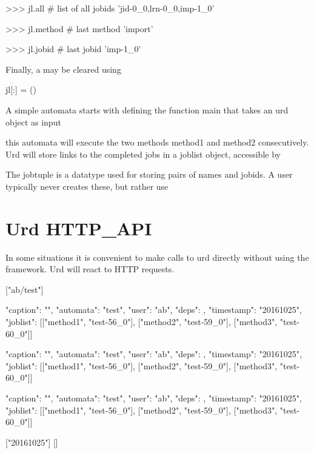 \begin{python}
>>> jl.all              # list of all jobids
'jid-0_0,lrn-0_0,imp-1_0'

>>> jl.method           # last method
'import'

>>> jl.jobid            # last jobid
'imp-1_0'
\end{python}

Finally, a \joblist may be cleared using

\begin{python}
jl[:] = ()
\end{python}



A simple automata starts with defining the function main that takes an
urd object as input

this automata will execute the two methods method1 and method2
consecutively.  Urd will store links to the completed jobs in a
joblist object, accessible by




The jobtuple is a datatype used for storing pairs of names and jobids.
A user typically never creates these, but rather use


\newpage
\section{Urd HTTP\_API}

In some situations it is convenient to make calls to urd directly
without using the framework.  Urd will react to HTTP requests.

\begin{shell}
["ab/test"]

{"caption": "", "automata": "test", "user": "ab", "deps": {},
  "timestamp": "20161025", "joblist": [["method1", "test-56_0"],
  ["method2", "test-59_0"], ["method3", "test-60_0"]]}

{"caption": "", "automata": "test", "user": "ab", "deps": {},
  "timestamp": "20161025", "joblist": [["method1", "test-56_0"],
  ["method2", "test-59_0"], ["method3", "test-60_0"]]}

{"caption": "", "automata": "test", "user": "ab", "deps": {},
  "timestamp": "20161025", "joblist": [["method1", "test-56_0"],
  ["method2", "test-59_0"], ["method3", "test-60_0"]]}

["20161025"]
[]                                 
\end{shell}
